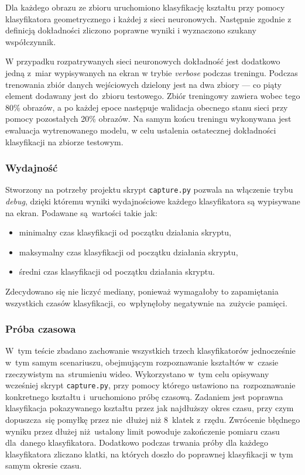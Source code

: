 \documentclass[11pt,a4paper]{article}
\begin{document}
Dla każdego obrazu ze zbioru \cite{shapes} uruchomiono klasyfikację kształtu przy pomocy klasyfikatora geometrycznego i każdej z sieci neuronowych. Następnie zgodnie z definicją dokładności zliczono poprawne wyniki i wyznaczono szukany współczynnik.

W przypadku rozpatrywanych sieci neuronowych dokładność jest dodatkowo jedną z~miar wypisywanych na ekran w trybie \emph{verbose} podczas treningu. Podczas trenowania zbiór danych wejściowych dzielony jest na dwa zbiory --- co piąty element dodawany jest do~zbioru testowego. Zbiór treningowy zawiera wobec tego 80\% obrazów, a po każdej epoce następuje walidacja obecnego stanu sieci przy pomocy pozostałych 20\% obrazów. Na samym końcu treningu wykonywana jest ewaluacja wytrenowanego modelu, w celu ustalenia ostatecznej dokładności klasyfikacji na zbiorze testowym.

\subsubsection{Wydajność}

Stworzony na potrzeby projektu skrypt \verb+capture.py+ pozwala na włączenie trybu \emph{debug}, dzięki któremu wyniki wydajnościowe każdego klasyfikatora są wypisywane na ekran. Podawane są~wartości takie jak:
\begin{itemize}
    \item minimalny czas klasyfikacji od początku działania skryptu,
    \item maksymalny czas klasyfikacji od początku działania skryptu,
    \item średni czas klasyfikacji od początku działania skryptu.
\end{itemize}
Zdecydowano się nie liczyć mediany, ponieważ wymagałoby to zapamiętania wszystkich czasów klasyfikacji, co~wpłynęłoby negatywnie na~zużycie pamięci.

\subsubsection{Próba czasowa}

W~tym teście zbadano zachowanie wszystkich trzech klasyfikatorów jednocześnie w~tym samym scenariuszu, obejmującym rozpoznawanie kształtów w~czasie rzeczywistym na~strumieniu wideo. Wykorzystano w~tym celu opisywany wcześniej skrypt \verb+capture.py+, przy pomocy którego ustawiono na~rozpoznawanie konkretnego kształtu i~uruchomiono próbę czasową. Zadaniem jest poprawna klasyfikacja pokazywanego kształtu przez jak najdłuższy okres czasu, przy czym dopuszcza~się pomyłkę przez nie~dłużej niż 8~klatek z~rzędu. Zwrócenie błędnego wyniku przez dłużej niż~ustalony limit powoduje zakończenie pomiaru czasu dla~danego klasyfikatora. Dodatkowo podczas trwania próby dla każdego klasyfikatora zliczano klatki, na których doszło do poprawnej klasyfikacji w tym samym okresie czasu.
\end{document}

